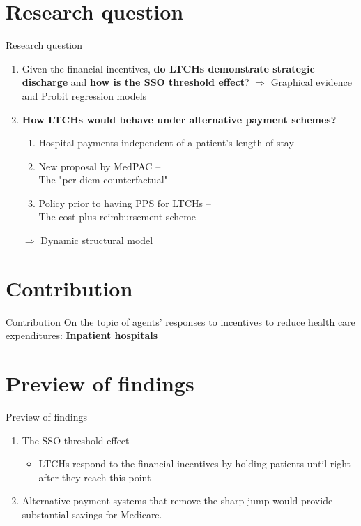 \documentclass{beamer}
\begin{document}
\section{Research question}
\begin{frame}{Research question}
\begin{enumerate}
    \item {} Given the financial incentives, \textbf{do LTCHs demonstrate strategic discharge} and \textbf{how is the SSO threshold effect}?
		$\Rightarrow$ Graphical evidence and Probit regression models
	
    \item<2->  \textbf{How LTCHs would behave under alternative payment schemes?}
		 \begin{enumerate}
		\item Hospital payments independent of a patient's length of stay
		\item New proposal by MedPAC -- \\ The "per diem counterfactual"
		\item Policy prior to having PPS for LTCHs -- \\ The cost-plus reimbursement scheme
		\end{enumerate}
		$\Rightarrow$ Dynamic structural model
\end{enumerate}
\end{frame}

\section{Contribution}
\begin{frame}{Contribution}
On the topic of agents' responses to incentives to reduce health care expenditures: \textbf{Inpatient hospitals} 

\end{frame}

\section{Preview of findings}
\begin{frame}{Preview of findings}
		 \begin{enumerate}
		\item The SSO threshold effect
				 \begin{itemize}
				\item LTCHs respond to the financial incentives by holding patients until right after
they reach this point
				\end{itemize}
		\item Alternative payment systems that remove the sharp jump would provide substantial savings for Medicare.
		\end{enumerate}
\end{frame}
\end{document}
